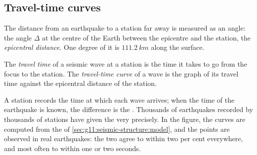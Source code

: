 \subsection{Travel-time curves}

The distance from an earthquake to a station far away is measured as an
angle: the angle $\Delta$ at the centre of the Earth between the epicentre and
the station, the \emph{epicentral distance}. One
degree of it is $\qty{111.2}{km}$ along the surface.

\begin{definition}\label{def:g11:seismic-structure:travel-time}
The \emph{travel time} of a seismic wave at a station is
the time it takes to go from the focus to the station. The
\emph{travel-time curve} of a wave is the graph of
its travel time against the epicentral distance of the station.
\end{definition}

A station records the time at which each wave arrives; when the time of the
earthquake is known, the difference is the . Thousands of
earthquakes recorded by thousands of stations have given the  very precisely. In the figure, the curves are computed from the
 of \cref{sec:g11:seismic-structure:model}, and the
points are  observed in real earthquakes: the two agree to within
two per cent everywhere, and most often to within one or two seconds.

